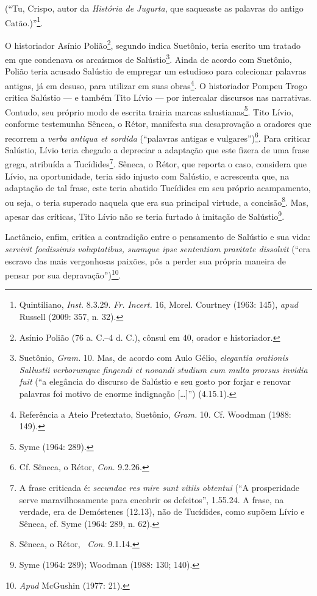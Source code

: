 (“Tu, Crispo,
autor da \emph{História de Jugurta}, que saqueaste as palavras do antigo
Catão.)”\footnote{Quintiliano, \emph{Inst.} 8.3.29. \emph{Fr. Incert.} 16, Morel. Courtney
(1963: 145), \emph{apud } Russell (2009: 357, n. 32).}.

O historiador Asínio Polião\footnote{Asínio Polião (76 a. C.--4 d. C.), cônsul
em 40, orador e historiador.}, segundo indica Suetônio, teria escrito um
tratado em que condenava os arcaísmos de Salústio\footnote{Suetônio, \emph{Gram.} 10. Mas, de acordo com Aulo Gélio,  \emph{elegantia orationis
Sallustii verborumque fingendi et novandi studium cum multa prorsus invidia
fuit} (“a elegância do discurso de Salústio e seu gosto por forjar e renovar
palavras foi motivo de enorme indignação [\ldots{}]”) (4.15.1).}. Ainda de acordo com Suetônio, Polião teria acusado Salústio de empregar
um estudioso para colecionar palavras antigas, já em desuso, para utilizar em
suas obras\footnote{ Referência a Ateio Pretextato, Suetônio, \emph{Gram.} 10. Cf. Woodman (1988: 149).}.  O historiador Pompeu Trogo critica Salústio ---
e também Tito Lívio --- por intercalar discursos nas narrativas. Contudo, seu
próprio modo de escrita trairia marcas salustianas\footnote{Syme (1964: 289).}. Tito Lívio, conforme testemunha Sêneca, o Rétor, manifesta sua
desaprovação a oradores que recorrem a \emph{verba antiqua et sordida}
(``palavras antigas e vulgares'')\footnote{ Cf. Sêneca, o Rétor, \emph{Con.}
9.2.26.}. Para criticar Salústio, Lívio teria chegado a depreciar a adaptação
que este fizera de uma frase grega, atribuída a Tucídides\footnote{A frase
criticada é: \emph{secundae res mire sunt vitiis obtentui} (“A prosperidade
serve maravilhosamente para encobrir os defeitos”, 1.55.24.
A frase, na verdade, era de Demóstenes  (12.13), não de Tucídides, como supõem
Lívio e Sêneca, cf. Syme (1964: 289, n. 62).}.  Sêneca, o Rétor, que reporta
o caso, considera que Lívio, na oportunidade, teria sido injusto com Salústio,
e acrescenta que, na adaptação de tal frase, este teria abatido Tucídides em
seu próprio acampamento, ou seja, o teria superado naquela que era sua
principal virtude, a concisão\footnote{Sêneca, o Rétor,  \emph{Con.} 9.1.14.}. Mas, apesar das críticas, Tito Lívio não se teria furtado à imitação de
Salústio\footnote{Syme (1964: 289); Woodman (1988: 130; 140).}. 

Lactâncio, enfim, critica a contradição entre o pensamento de Salústio e sua vida: \emph{servivit foedissimis voluptatibus, suamque ipse sententiam pravitate dissolvit} (``era escravo das mais vergonhosas paixões, pôs a perder sua própria maneira de pensar por sua depravação'')\footnote{\emph{Apud} McGushin (1977: 21).}.

